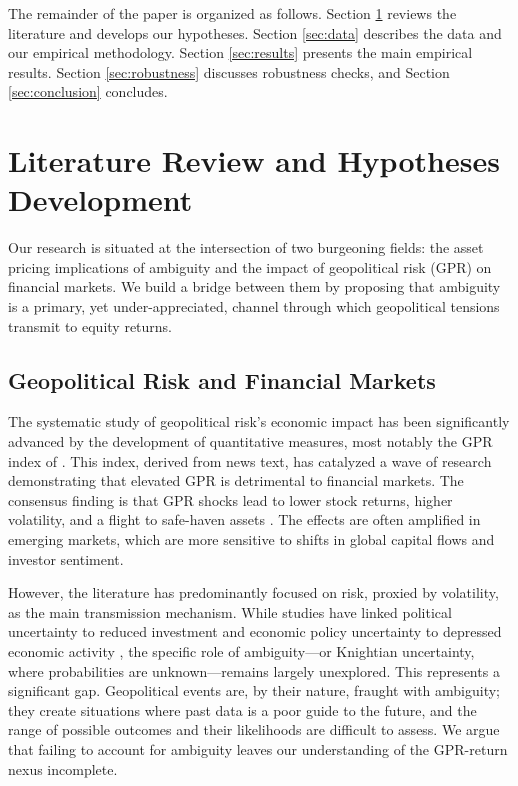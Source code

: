 \documentclass[preprint,12pt,authoryear]{elsarticle}
\begin{document}
The remainder of the paper is organized as follows. Section \ref{sec:literature} reviews the literature and develops our hypotheses. Section \ref{sec:data} describes the data and our empirical methodology. Section \ref{sec:results} presents the main empirical results. Section \ref{sec:robustness} discusses robustness checks, and Section \ref{sec:conclusion} concludes.

\section{Literature Review and Hypotheses Development}
\label{sec:literature}

Our research is situated at the intersection of two burgeoning fields: the asset pricing implications of ambiguity and the impact of geopolitical risk (GPR) on financial markets. We build a bridge between them by proposing that ambiguity is a primary, yet under-appreciated, channel through which geopolitical tensions transmit to equity returns.

\subsection{Geopolitical Risk and Financial Markets}

The systematic study of geopolitical risk's economic impact has been significantly advanced by the development of quantitative measures, most notably the GPR index of \citet{caldara2022measuring}. This index, derived from news text, has catalyzed a wave of research demonstrating that elevated GPR is detrimental to financial markets. The consensus finding is that GPR shocks lead to lower stock returns, higher volatility, and a flight to safe-haven assets \citep{caldara2022measuring}. The effects are often amplified in emerging markets, which are more sensitive to shifts in global capital flows and investor sentiment.

However, the literature has predominantly focused on risk, proxied by volatility, as the main transmission mechanism. While studies have linked political uncertainty to reduced investment \citep{pastor2013political} and economic policy uncertainty to depressed economic activity \citep{baker2016measuring}, the specific role of ambiguity—or Knightian uncertainty, where probabilities are unknown—remains largely unexplored. This represents a significant gap. Geopolitical events are, by their nature, fraught with ambiguity; they create situations where past data is a poor guide to the future, and the range of possible outcomes and their likelihoods are difficult to assess. We argue that failing to account for ambiguity leaves our understanding of the GPR-return nexus incomplete.
\end{document}
